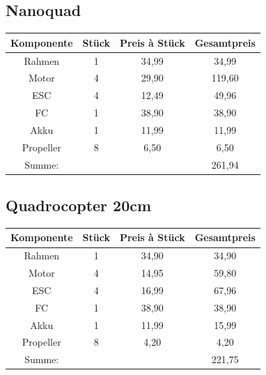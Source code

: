\documentclass[12pt,a4paper]{article}
\begin{document}
\subsection*{Nanoquad}

\begin{tabular}{|c|c|c|c|}\hline
Komponente & Stück & Preis à Stück & Gesamtpreis\\\hline\hline
Rahmen & 1 & 34,99 & 34,99\\
Motor & 4 & 29,90 & 119,60\\
ESC & 4 & 12,49 & 49,96\\
FC & 1 & 38,90 & 38,90\\
Akku & 1 & 11,99 & 11,99\\
Propeller & 8 & 6,50 & 6,50\\\hline\hline
Summe: & & & 261,94 \\\hline\hline
\end{tabular}

\subsection*{Quadrocopter 20cm}

\begin{tabular}{|c|c|c|c|}\hline
Komponente & Stück & Preis à Stück & Gesamtpreis\\\hline\hline
Rahmen & 1 & 34,90 & 34,90\\
Motor & 4 & 14,95 & 59,80\\
ESC & 4 & 16,99 & 67,96\\
FC & 1 & 38,90 & 38,90\\
Akku & 1 & 11,99 & 15,99\\
Propeller & 8 & 4,20 & 4,20\\\hline\hline
Summe: & & & 221,75 \\\hline\hline
\end{tabular}
\end{document}
